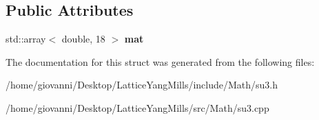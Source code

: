 \subsection*{Public Attributes}
\begin{DoxyCompactItemize}
\item 
std\+::array$<$ double, 18 $>$ {\bfseries mat}\hypertarget{structSU3_acf8e4278a5ad59ae35c0c6cbc1e81685}{}\label{structSU3_acf8e4278a5ad59ae35c0c6cbc1e81685}

\end{DoxyCompactItemize}


The documentation for this struct was generated from the following files\+:\begin{DoxyCompactItemize}
\item 
/home/giovanni/\+Desktop/\+Lattice\+Yang\+Mills/include/\+Math/su3.\+h\item 
/home/giovanni/\+Desktop/\+Lattice\+Yang\+Mills/src/\+Math/su3.\+cpp\end{DoxyCompactItemize}
